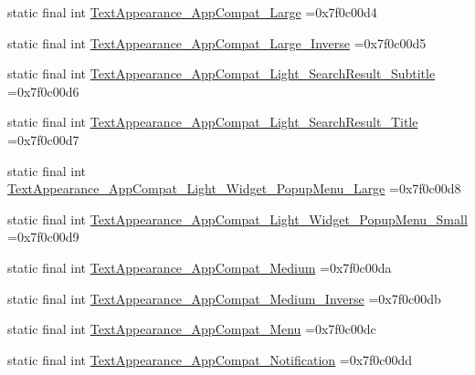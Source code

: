 \begin{DoxyCompactItemize}
\item 
static final int \mbox{\hyperlink{classbr_1_1unb_1_1cic_1_1mp_1_1marketmaster_1_1test_1_1R_1_1style_af9703885a6f77eb8266b50e586f0b418}{Text\+Appearance\+\_\+\+App\+Compat\+\_\+\+Large}} =0x7f0c00d4
\item 
static final int \mbox{\hyperlink{classbr_1_1unb_1_1cic_1_1mp_1_1marketmaster_1_1test_1_1R_1_1style_aa71c4efffb21091ecc07411c1f1ca034}{Text\+Appearance\+\_\+\+App\+Compat\+\_\+\+Large\+\_\+\+Inverse}} =0x7f0c00d5
\item 
static final int \mbox{\hyperlink{classbr_1_1unb_1_1cic_1_1mp_1_1marketmaster_1_1test_1_1R_1_1style_ae646d1118d8875f3e5dbf82ab2dfa26b}{Text\+Appearance\+\_\+\+App\+Compat\+\_\+\+Light\+\_\+\+Search\+Result\+\_\+\+Subtitle}} =0x7f0c00d6
\item 
static final int \mbox{\hyperlink{classbr_1_1unb_1_1cic_1_1mp_1_1marketmaster_1_1test_1_1R_1_1style_ad869ebdc619d32ea819759e2d1d1f05f}{Text\+Appearance\+\_\+\+App\+Compat\+\_\+\+Light\+\_\+\+Search\+Result\+\_\+\+Title}} =0x7f0c00d7
\item 
static final int \mbox{\hyperlink{classbr_1_1unb_1_1cic_1_1mp_1_1marketmaster_1_1test_1_1R_1_1style_a12f48923bfc394eeccf5005427833a12}{Text\+Appearance\+\_\+\+App\+Compat\+\_\+\+Light\+\_\+\+Widget\+\_\+\+Popup\+Menu\+\_\+\+Large}} =0x7f0c00d8
\item 
static final int \mbox{\hyperlink{classbr_1_1unb_1_1cic_1_1mp_1_1marketmaster_1_1test_1_1R_1_1style_a704ee8ecf2aef59f5e3df794aabae170}{Text\+Appearance\+\_\+\+App\+Compat\+\_\+\+Light\+\_\+\+Widget\+\_\+\+Popup\+Menu\+\_\+\+Small}} =0x7f0c00d9
\item 
static final int \mbox{\hyperlink{classbr_1_1unb_1_1cic_1_1mp_1_1marketmaster_1_1test_1_1R_1_1style_a4ec560ce687b93b3f7abc873bd9d3c3f}{Text\+Appearance\+\_\+\+App\+Compat\+\_\+\+Medium}} =0x7f0c00da
\item 
static final int \mbox{\hyperlink{classbr_1_1unb_1_1cic_1_1mp_1_1marketmaster_1_1test_1_1R_1_1style_ae9afb474d2f08828d79d26b37db1d376}{Text\+Appearance\+\_\+\+App\+Compat\+\_\+\+Medium\+\_\+\+Inverse}} =0x7f0c00db
\item 
static final int \mbox{\hyperlink{classbr_1_1unb_1_1cic_1_1mp_1_1marketmaster_1_1test_1_1R_1_1style_ab369442a9971f6c938d157263d977d00}{Text\+Appearance\+\_\+\+App\+Compat\+\_\+\+Menu}} =0x7f0c00dc
\item 
static final int \mbox{\hyperlink{classbr_1_1unb_1_1cic_1_1mp_1_1marketmaster_1_1test_1_1R_1_1style_a045122c0de99925a6db29b848be69c44}{Text\+Appearance\+\_\+\+App\+Compat\+\_\+\+Notification}} =0x7f0c00dd

\end{DoxyCompactItemize}
